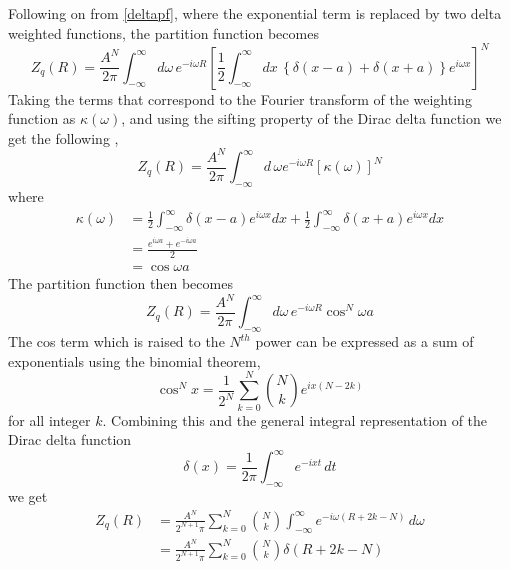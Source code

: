 Following on from \eqref{deltapf}, where the exponential term is replaced by two delta weighted functions, the partition function
becomes
%
\begin{equation}
Z_{q}\left(R\right)=\frac{A^{N}}{2\pi}\int_{-\infty}^{\infty}d\omega\, e^{-i\omega R}\left[\frac{1}{2}\int_{-\infty}^{\infty}dx\,\left\{ \delta\left(x-a\right)+\delta\left(x+a\right)\right\} e^{i\omega x}\right]^{N}
\end{equation}
%
Taking the terms that correspond to the Fourier transform of the weighting function as $\kappa\left(\omega\right)$, and using the sifting property of the Dirac delta function we get the following \cite{Riley2002},
%
\begin{equation}
Z_{q}\left(R\right)=\frac{A^{N}}{2\pi}\int_{-\infty}^{\infty}d\,\omega e^{-i\omega R}\left[\kappa\left(\omega\right)\right]^{N}
\end{equation}
%
where
%
\begin{align}
\kappa\left(\omega\right)&=\frac{1}{2}\int_{-\infty}^{\infty}\delta\left(x-a\right)e^{i\omega x}dx+\frac{1}{2}\int_{-\infty}^{\infty}\delta\left(x+a\right)e^{i\omega x}dx \\
&=\frac{e^{i\omega a}+e^{-i\omega a}}{2}\\
&=\cos \omega a
\end{align}
%
The partition function then becomes
%
\begin{equation}
Z_{q}\left(R\right)=\frac{A^{N}}{2\pi}\int_{-\infty}^{\infty}d\omega\, e^{-i\omega R}\cos^{N}\omega a
\end{equation}
%
The cos term which is raised to the $N^{th}$ power can be expressed as a sum of exponentials using the binomial theorem,
%
\begin{equation}
\cos^{N}x=\frac{1}{2^{N}}\sum_{k=0}^{N}\binom{N}{k}e^{ix(N-2k)}\label{Cos_Series}
\end{equation}
%
for all integer $k$. Combining this and the general integral representation of the Dirac delta function \cite{Riley2002}
%
\begin{equation}
\delta(x)=\frac{1}{2\pi}\int_{-\infty}^{\infty}e^{-ixt}\, dt
\end{equation}
%
we get
%
\begin{align}
Z_{q}\left(R\right) & =\frac{A^{N}}{2^{N+1}\pi}\sum_{k=0}^{N}\binom{N}{k}\int_{-\infty}^{\infty}e^{-i\omega\left(R+2k-N\right)}\, d\omega\\
 & =\frac{A^{N}}{2^{N+1}\pi}\sum_{k=0}^{N}\binom{N}{k}\delta\left(R+2k-N\right)\label{pfSolved1D_1}\end{align}
